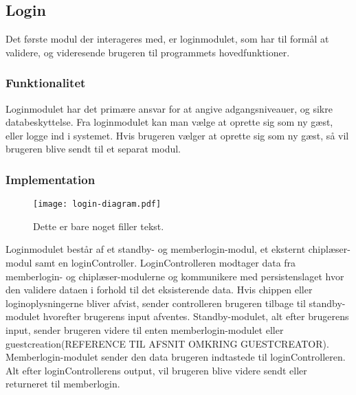 \subsection{Login}
\label{sub:login}

Det første modul der interageres med, er loginmodulet, som har til formål at validere, og videresende brugeren til programmets hovedfunktioner.

\subsubsection{Funktionalitet}
\label{ssub:login_funktionalitet}

Loginmodulet har det primære ansvar for at angive adgangsniveauer, og sikre databeskyttelse. Fra loginmodulet kan man vælge at oprette sig som ny gæst, eller logge ind i systemet. Hvis brugeren vælger at oprette sig som ny gæst, så vil brugeren blive sendt til et separat modul.

\subsubsection{Implementation}
\label{ssub:login_implementation}

\begin{figure}
  \centering
  \texttt{[image: login-diagram.pdf]}
  \caption{Dette er bare noget filler tekst.}
\end{figure}


Loginmodulet består af et standby- og memberlogin-modul, et eksternt chiplæser-modul samt en loginController.
LoginControlleren modtager data fra memberlogin- og chiplæser-modulerne og kommunikere med persistenslaget hvor den validere dataen i forhold til det eksisterende data. Hvis chippen eller loginoplysningerne bliver afvist, sender controlleren brugeren tilbage til standby-modulet hvorefter brugerens input afventes.
Standby-modulet, alt efter brugerens input, sender brugeren videre til enten memberlogin-modulet eller guestcreation(REFERENCE TIL AFSNIT OMKRING GUESTCREATOR). Memberlogin-modulet sender den data brugeren indtastede til loginControlleren. Alt efter loginControllerens output, vil brugeren blive videre sendt eller returneret til memberlogin.



